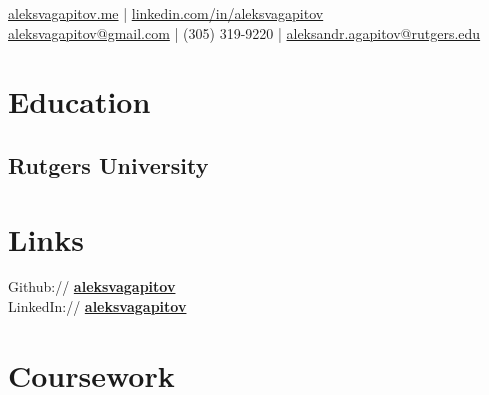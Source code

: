 \documentclass[]{Resume}
\begin{document}
%
%

%
%
{ 
\href{http://aleksvagapitov.me/}{aleksvagapitov.me} | \href{https://www.linkedin.com/in/aleksvagapitov/}{linkedin.com/in/aleksvagapitov}\\
\href{mailto:aleksvagapitov@gmail.com}{aleksvagapitov@gmail.com} | (305) 319-9220 | \href{mailto:aleksandr.agapitov@rutgers.edu}{aleksandr.agapitov@rutgers.edu} \\
}

%
%

\begin{minipage}[t]{0.33\textwidth} 


\section{Education} 

\subsection{Rutgers University}
\sectionsep



\section{Links} 
Github:// \href{https://github.com/aleksvagapitov}{\bf aleksvagapitov} \\
LinkedIn://  \href{https://www.linkedin.com/in/aleksvagapitov//}{\bf aleksvagapitov}


\section{Coursework}


\end{minipage}
\end{document}
